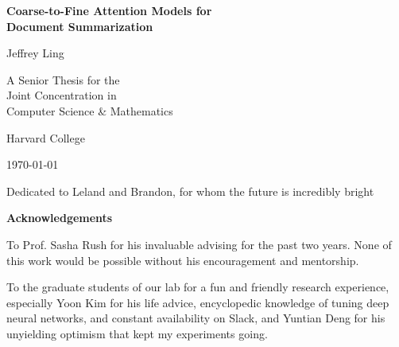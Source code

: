 \documentclass[12pt]{report}
\begin{document}


\begin{titlepage}
	\centering
	\vspace*{2cm}
	{\Huge\bfseries Coarse-to-Fine Attention Models for \\
				Document Summarization \par}
	\vfill
	{\LARGE Jeffrey Ling\par}
	\vspace{1cm}
	{\Large A Senior Thesis for the \\
		Joint Concentration in \\
	Computer Science \& Mathematics\par}
	\vspace{1cm}
	{\Large Harvard College\par}
	\vspace{1cm}
	{\Large \today }

	\vfill

\end{titlepage}
\onehalfspacing

\clearpage
\thispagestyle{empty}
\vspace*{4cm}
\begin{center}
 Dedicated to Leland and Brandon, for whom the future is incredibly bright
\end{center}
\clearpage


\clearpage
\thispagestyle{empty}
\vspace*{2cm}
\begin{center}
\LARGE\bf Acknowledgements
\end{center}
\vspace{1cm}

To Prof. Sasha Rush for his invaluable advising for the past two years. None of this work would be possible without his encouragement and mentorship.

To the graduate students of our lab for a fun and friendly research experience, especially Yoon Kim for his life advice, encyclopedic knowledge of tuning deep neural networks, and constant availability on Slack,
and Yuntian Deng for his unyielding optimism that kept my experiments going.
\end{document}
